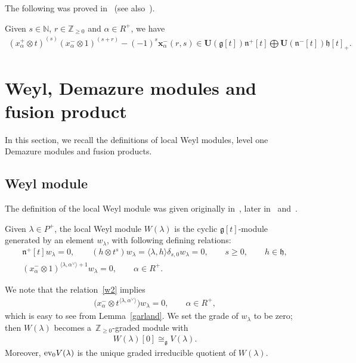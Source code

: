 The following was proved in~\cite{G} (see also~\cite[Lemma 2.3]{CV}).
\begin{lemma}\label{garland}
Given $s\in\mathbb{N}$, $r\in\mathbb{Z}_{\geq0}$ and $\alpha\in R^{+}$, we have
\begin{gather*}
(x^{+}_{\alpha} \otimes t)^{(s)}(x^{-}_{\alpha} \otimes
1)^{(s+r)}-(-1)^s\mathbf{x}^{-}_{\alpha}(r,s)\in\mathbf{U}(\mathfrak{g}[t])\mathfrak{n}^{+}[t]\bigoplus
\mathbf{U}(\mathfrak{n}^{-}[t])\mathfrak{h}[t]_{+}.
\end{gather*}
\end{lemma}

\section{Weyl, Demazure modules and fusion product}\label{section3}

In this section, we recall the def\/initions of local Weyl modules, level one Demazure modules and fusion products.

\subsection{Weyl module}\label{section3.1}

The def\/inition of the local Weyl module was given originally in~\cite{CP}, later in~\cite{CFK} and~\cite{FL}.
\begin{definition}
Given $\lambda \in P^+$, the local Weyl module $W(\lambda)$ is the cyclic $\mathfrak{g}[t]$-module generated by an
element $w_\lambda$, with following def\/ining relations:
\begin{gather}
\mathfrak{n}^{+}[t]  w_\lambda=0,
\qquad
(h \otimes t^s)  w_\lambda = \langle \lambda, h \rangle \delta_{s,0} w_\lambda=0,
\qquad
s\geq0,
\qquad
h\in\mathfrak{h},
\nonumber
\\
(x^{-}_\alpha \otimes 1)^{\langle \lambda,
\alpha^{\vee} \rangle + 1}w_\lambda=0,
\qquad
\alpha \in R^{+}.
\label{w2}
\end{gather}
\end{definition}
\noindent We note that the relation~\eqref{w2} implies
\begin{gather}
\label{w2'}
\big(x^{-}_\alpha \otimes t^{\langle \lambda,
\alpha^{\vee} \rangle}\big)  w_\lambda=0,
\qquad
\alpha \in R^{+},
\end{gather}
which is easy to see from Lemma~\ref{garland}.
We set the grade of $w_\lambda$ to be zero; then $W(\lambda)$ becomes a~$\mathbb{Z}_{\geq 0}$-graded module with
\begin{gather*}
W(\lambda)[0] \cong_{\mathfrak{g}} V(\lambda).
\end{gather*}
Moreover, $\textup{ev}_0 V(\lambda)$ is the unique graded irreducible quotient of $W(\lambda)$.

